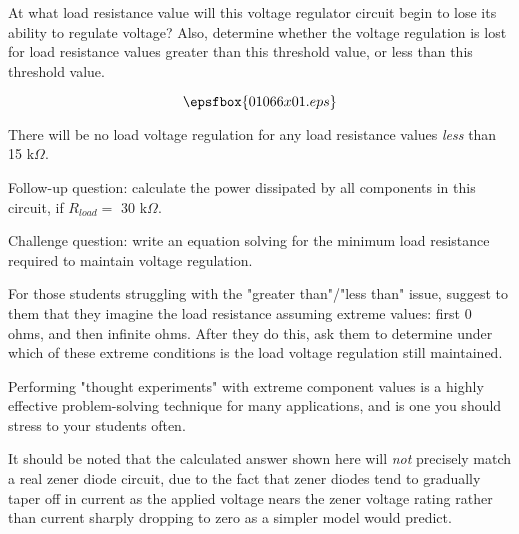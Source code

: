 

At what load resistance value will this voltage regulator circuit begin to lose its ability to regulate voltage?  Also, determine whether the voltage regulation is lost for load resistance values greater than this threshold value, or less than this threshold value.

$$\epsfbox{01066x01.eps}$$







There will be no load voltage regulation for any load resistance values {\it less} than 15 k$\Omega$.

\vskip 10pt

Follow-up question: calculate the power dissipated by all components in this circuit, if $R_{load} =$ 30 k$\Omega$.

\vskip 10pt

Challenge question: write an equation solving for the minimum load resistance required to maintain voltage regulation.







For those students struggling with the "greater than"/"less than" issue, suggest to them that they imagine the load resistance assuming extreme values: first 0 ohms, and then infinite ohms.  After they do this, ask them to determine under which of these extreme conditions is the load voltage regulation still maintained.

Performing "thought experiments" with extreme component values is a highly effective problem-solving technique for many applications, and is one you should stress to your students often.

It should be noted that the calculated answer shown here will {\it not} precisely match a real zener diode circuit, due to the fact that zener diodes tend to gradually taper off in current as the applied voltage nears the zener voltage rating rather than current sharply dropping to zero as a simpler model would predict.




